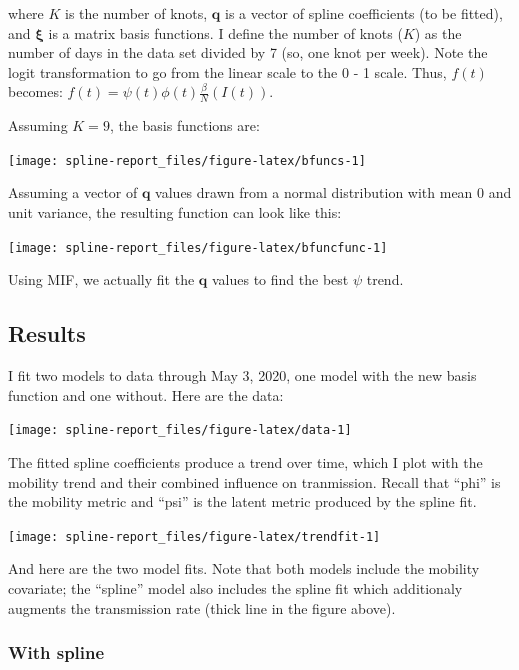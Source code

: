 \documentclass[]{article}
\begin{document}
where \(K\) is the number of knots, \(\mathbf{q}\) is a vector of spline
coefficients (to be fitted), and \(\mathbf{\xi}\) is a matrix basis
functions. I define the number of knots (\(K\)) as the number of days in
the data set divided by 7 (so, one knot per week). Note the logit
transformation to go from the linear scale to the 0 - 1 scale. Thus,
\(f(t)\) becomes: \(f(t) = \psi(t)\phi(t)\frac{\beta}{N} (I(t))\).

Assuming \(K = 9\), the basis functions are:

\texttt{[image: spline-report\_files/figure-latex/bfuncs-1]}

Assuming a vector of \(\mathbf{q}\) values drawn from a normal
distribution with mean 0 and unit variance, the resulting function can
look like this:

\texttt{[image: spline-report\_files/figure-latex/bfuncfunc-1]}

Using MIF, we actually fit the \(\mathbf{q}\) values to find the best
\(\psi\) trend.

\hypertarget{results}{%
\subsection{Results}\label{results}}

I fit two models to data through May 3, 2020, one model with the new
basis function and one without. Here are the data:

\texttt{[image: spline-report\_files/figure-latex/data-1]}

The fitted spline coefficients produce a trend over time, which I plot
with the mobility trend and their combined influence on tranmission.
Recall that ``phi'' is the mobility metric and ``psi'' is the latent
metric produced by the spline fit.

\texttt{[image: spline-report\_files/figure-latex/trendfit-1]}

And here are the two model fits. Note that both models include the
mobility covariate; the ``spline'' model also includes the spline fit
which additionaly augments the transmission rate (thick line in the
figure above).

\hypertarget{with-spline}{%
\subsubsection{With spline}\label{with-spline}}
\end{document}
